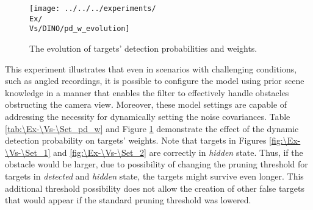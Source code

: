 \begin{figure}[H]
    \centering
    \texttt{[image: ../../../experiments/\\Ex/\\Vs/DINO/pd\_w\_evolution]}
    \caption{The evolution of targets' detection probabilities and weights.}
    \label{gr:\Ex-\Vs-\Set}
\end{figure}

This experiment illustrates that even in scenarios with challenging conditions, such as angled recordings, it is
possible to configure the model using prior scene knowledge in \linebreak a manner that enables the filter to effectively handle
obstacles obstructing the camera view.
Moreover, these model settings are capable of addressing the necessity for dynamically setting the noise covariances.
Table \ref{tab:\Ex-\Vs-\Set_pd_w} and Figure \ref{gr:\Ex-\Vs-\Set} demonstrate the effect of the dynamic detection
probability
on targets' weights.
Note that targets
in Figures \ref{fig:\Ex-\Vs-\Set_1} and \ref{fig:\Ex-\Vs-\Set_2} are correctly in \textit{hidden} state. Thus, if the
obstacle would be larger, due to possibility of changing the pruning threshold for targets in \textit{detected} and \textit{hidden} state, the targets might survive even longer. This additional threshold possibility does not allow the creation of other false targets that would appear if the standard pruning threshold was lowered.